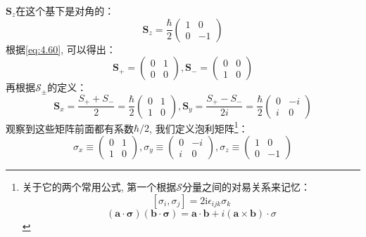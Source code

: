 \documentclass[a4paper,zihao=-4,linespread=1]{ctexrep}
\newenvironment{lequation}{\large\begin{equation}}{\end{equation}}
\begin{document}
    $\mathbf{S}_z$在这个基下是对角的：
    \begin{equation}
    \mathbf{S}_z = \frac{\hbar }{2} \begin{pmatrix}
        1& 0\\
        0& -1
    \end{pmatrix}
    \end{equation}
    根据\ref{eq:4.60}, 可以得出：
    \begin{equation}
        \mathbf{S}_+=\begin{pmatrix}
            0&1\\
            0&0
        \end{pmatrix},
        \mathbf{S}_-=\begin{pmatrix}
            0&0\\
            1&0
        \end{pmatrix}
    \end{equation}
    再根据$\mathcal{S}_\pm$的定义：
    \begin{equation}
        \mathbf{S}_x=\frac{S_++S_-}{2}=\frac{\hbar}{2}
        \begin{pmatrix}
            0&1\\
            1&0
        \end{pmatrix},
        \mathbf{S}_y=\frac{S_+-S_-}{2i}=\frac{\hbar}{2}
        \begin{pmatrix}
            0&-i\\
            i&0
        \end{pmatrix}
    \end{equation}
    观察到这些矩阵前面都有系数$\hbar/2$, 我们定义泡利矩阵\footnote{关于它的两个常用公式, 第一个根据$\mathcal{S}$分量之间的对易关系来记忆：
    \[\left[\sigma_i,\sigma_j\right]=2\mathrm{i}\epsilon_{ijk}\sigma_k\]\[(\mathbf{a} \cdot \boldsymbol{\sigma})(\mathbf{b} \cdot \boldsymbol{\sigma})=\mathbf{a} \cdot \mathbf{b}+i(\mathbf{a} \times \mathbf{b}) \cdot \sigma\]}：
    \begin{lequation}
        \boxed{
            \sigma_x\equiv\begin{pmatrix}
                0&1\\
                1&0
            \end{pmatrix},
            \sigma_y\equiv\begin{pmatrix}
                0&-i\\
                i&0
            \end{pmatrix},
            \sigma_z\equiv\begin{pmatrix}
                1&0\\
                0&-1
            \end{pmatrix}
        }
    \end{lequation}
    
\end{document}
